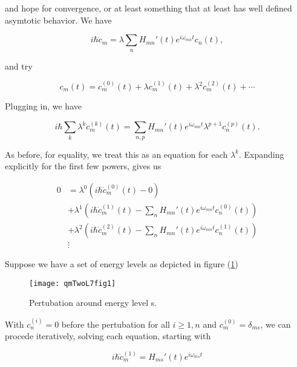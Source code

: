 and hope for convergence, or at least something that at least has well defined asymtotic behavior.  We have

\begin{equation}\label{eqn:qmTwoL7:430}
i \hbar \dot{c}_m = \lambda \sum_n H_{mn}'(t) e^{i \omega_{mn} t} c_n(t),
\end{equation}

and try

\begin{equation}\label{eqn:qmTwoL7:450}
c_m(t) = c_m^{(0)}(t) + \lambda c_m^{(1)}(t) + \lambda^2 c_m^{(2)}(t) + \cdots
\end{equation}

Plugging in, we have

\begin{equation}\label{eqn:qmTwoL7:470}
i \hbar
\sum_k
\lambda^k \dot{c}_m^{(k)}(t)
=
\sum_{n,p} H_{mn}'(t) e^{i \omega_{mn} t}
\lambda^{p+1} c_n^{(p)}(t).
\end{equation}

As before, for equality, we treat this as an equation for each $\lambda^k$.  Expanding explicitly for the first few powers, gives us

\begin{align*}
0
&= \lambda^0 \left( i \hbar \dot{c}_m^{(0)}(t) - 0 \right) \\
&+ \lambda^1 \left( i \hbar \dot{c}_m^{(1)}(t) -
\sum_{n} H_{mn}'(t) e^{i \omega_{mn} t}
c_n^{(0)}(t)
\right) \\
&+ \lambda^2 \left( i \hbar \dot{c}_m^{(2)}(t) -
\sum_{n} H_{mn}'(t) e^{i \omega_{mn} t}
c_n^{(1)}(t)
\right) \\
&\vdots
\end{align*}

Suppose we have a set of energy levels as depicted in figure (\ref{fig:qmTwoL7fig1})

\begin{figure}[htp]
\centering
\texttt{[image: qmTwoL7fig1]}
\caption{Pertubation around energy level s.}\label{fig:qmTwoL7fig1}
\end{figure}

With $c_n^{(i)} = 0$ before the pertubation for all $i \ge 1, n$ and $c_m^{(0)} = \delta_{ms}$, we can procede iteratively, solving each equation, starting with

\begin{equation}\label{eqn:qmTwoL7:490}
i \hbar \dot{c}_m^{(1)} = H_{ms}'(t) e^{i \omega_{ms} t}
\end{equation}

